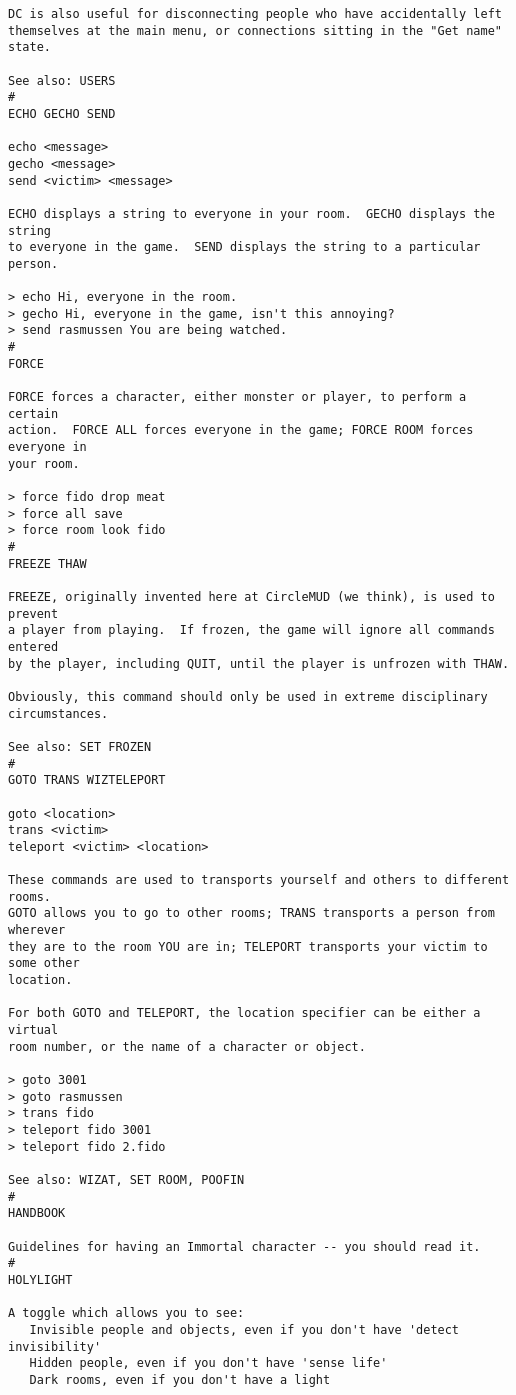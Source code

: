 \documentclass[11pt]{article}
\begin{document}
\begin{verbatim}
DC is also useful for disconnecting people who have accidentally left
themselves at the main menu, or connections sitting in the "Get name" state.

See also: USERS
#
ECHO GECHO SEND

echo <message>
gecho <message>
send <victim> <message>

ECHO displays a string to everyone in your room.  GECHO displays the string
to everyone in the game.  SEND displays the string to a particular person.

> echo Hi, everyone in the room.
> gecho Hi, everyone in the game, isn't this annoying?
> send rasmussen You are being watched.
#
FORCE

FORCE forces a character, either monster or player, to perform a certain
action.  FORCE ALL forces everyone in the game; FORCE ROOM forces everyone in
your room.

> force fido drop meat
> force all save
> force room look fido
#
FREEZE THAW

FREEZE, originally invented here at CircleMUD (we think), is used to prevent
a player from playing.  If frozen, the game will ignore all commands entered
by the player, including QUIT, until the player is unfrozen with THAW.

Obviously, this command should only be used in extreme disciplinary
circumstances.

See also: SET FROZEN
#
GOTO TRANS WIZTELEPORT

goto <location>
trans <victim>
teleport <victim> <location>

These commands are used to transports yourself and others to different rooms.
GOTO allows you to go to other rooms; TRANS transports a person from wherever
they are to the room YOU are in; TELEPORT transports your victim to some other
location.

For both GOTO and TELEPORT, the location specifier can be either a virtual
room number, or the name of a character or object.

> goto 3001
> goto rasmussen
> trans fido
> teleport fido 3001
> teleport fido 2.fido

See also: WIZAT, SET ROOM, POOFIN
#
HANDBOOK

Guidelines for having an Immortal character -- you should read it.
#
HOLYLIGHT

A toggle which allows you to see:
   Invisible people and objects, even if you don't have 'detect invisibility'
   Hidden people, even if you don't have 'sense life'
   Dark rooms, even if you don't have a light


\end{verbatim}
\end{document}
